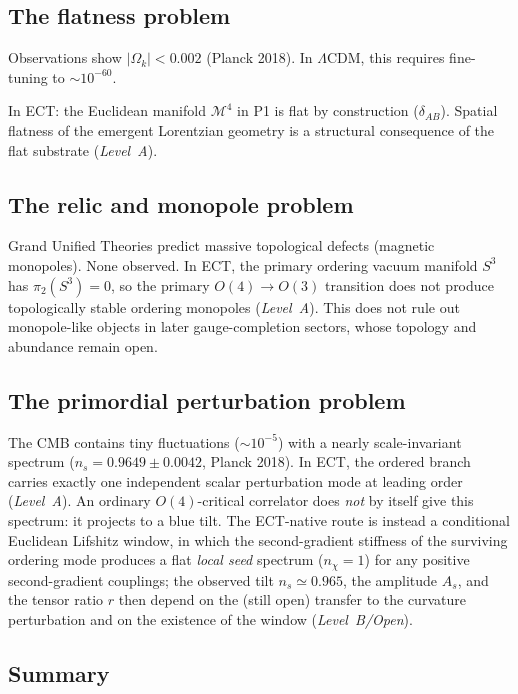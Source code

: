 \documentclass[11pt,a4paper]{article}
\begin{document}
\subsection{The flatness problem}

Observations show $|\Omega_k| < 0.002$ (Planck 2018). In $\Lambda$CDM, this requires fine-tuning to $\sim 10^{-60}$.

In ECT: the Euclidean manifold $\mathcal{M}^4$ in P1 is flat by construction ($\delta_{AB}$). Spatial flatness of the emergent Lorentzian geometry is a structural consequence of the flat substrate (\emph{Level~A}).

\subsection{The relic and monopole problem}

Grand Unified Theories predict massive topological defects (magnetic monopoles). None observed. In ECT, the primary ordering vacuum manifold $S^3$ has $\pi_2(S^3)=0$, so the primary $O(4)\to O(3)$ transition does not produce topologically stable ordering monopoles (\emph{Level~A}). This does not rule out monopole-like objects in later gauge-completion sectors, whose topology and abundance remain open.

\subsection{The primordial perturbation problem}

The CMB contains tiny fluctuations ($\sim 10^{-5}$) with a nearly scale-invariant spectrum ($n_s = 0.9649 \pm 0.0042$, Planck 2018). In ECT, the ordered branch carries exactly one independent scalar perturbation mode at leading order (\emph{Level~A}). An ordinary $O(4)$-critical correlator does \emph{not} by itself give this spectrum: it projects to a blue tilt. The ECT-native route is instead a conditional Euclidean Lifshitz window, in which the second-gradient stiffness of the surviving ordering mode produces a flat \emph{local seed} spectrum ($n_\chi = 1$) for any positive second-gradient couplings; the observed tilt $n_s \simeq 0.965$, the amplitude $A_s$, and the tensor ratio $r$ then depend on the (still open) transfer to the curvature perturbation and on the existence of the window (\emph{Level~B/Open}).

\subsection{Summary}
\end{document}
